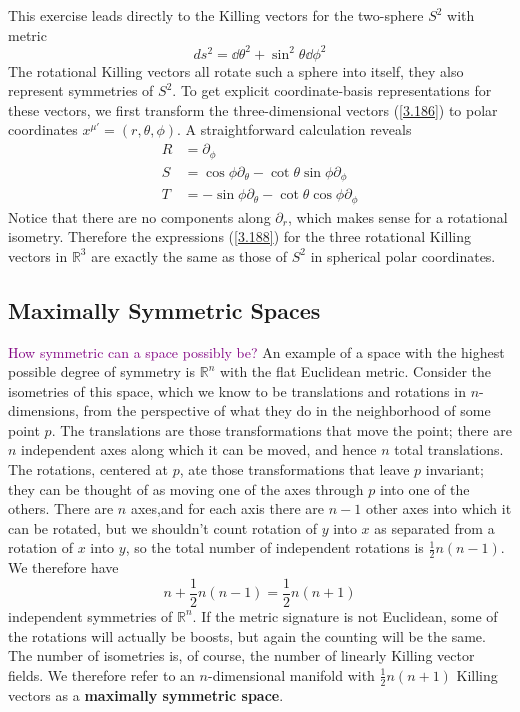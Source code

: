 \begin{tcolorbox}
This exercise leads directly to the Killing vectors for the two-sphere $S^2$ with metric
\begin{equation*}
    ds^2=\dd\theta^2+\sin^2\theta\dd\phi^2
\end{equation*}
The rotational Killing vectors all rotate such a sphere into itself, they also represent symmetries of $S^2$. To get explicit coordinate-basis representations for these vectors, we first transform the three-dimensional vectors (\ref{3.186}) to polar coordinates $x^{\mu'}=(r,\theta,\phi)$. A straightforward calculation reveals
\begin{align}\label{3.188}
    \nonumber R&=\partial_\phi\\
    \nonumber S&=\cos\phi\partial_\theta - \cot\theta\sin\phi\partial_\phi\\
     T&=-\sin\phi\partial_\theta - \cot\theta\cos\phi\partial_\phi
\end{align}
Notice that there are no components along $\partial_r$, which makes sense for a rotational isometry. Therefore the expressions (\ref{3.188}) for the three rotational Killing vectors in $\mathbb{R}^3$ are exactly the same as those of $S^2$ in spherical polar coordinates.
\end{tcolorbox}

\subsection{Maximally Symmetric Spaces}
\textcolor{purple}{How symmetric can a space possibly be?} An example of a space with the highest possible degree of symmetry is $\mathbb{R}^n$ with the flat Euclidean metric. Consider the isometries of this space, which we know to be translations and rotations in $n$-dimensions, from the perspective of what they do in the neighborhood of some point $p$. The translations are those transformations that move the point; there are $n$ independent axes along which it can be moved, and hence $n$ total translations. The rotations, centered at $p$, ate those transformations that leave $p$ invariant; they can be thought of as moving one of the axes through $p$ into one of the others.  There are $n$ axes,and for each axis there are $n-1$ other axes into which it can be rotated, but we shouldn't count rotation of $y$ into $x$ as separated from a rotation of $x$ into $y$, so the total number of independent rotations is $\frac{1}{2}n(n-1)$. We therefore have
\begin{equation*}
    n+\frac{1}{2}n(n-1)=\frac{1}{2}n(n+1)
\end{equation*}
independent symmetries of $\mathbb{R}^n$. If the metric signature is not Euclidean, some of the rotations will actually be boosts, but again the counting will be the same. The number of isometries is, of course, the number of linearly Killing vector fields. We therefore refer to an $n$-dimensional manifold with $\frac{1}{2}n(n+1)$ Killing vectors as a \textbf{maximally symmetric space}.

